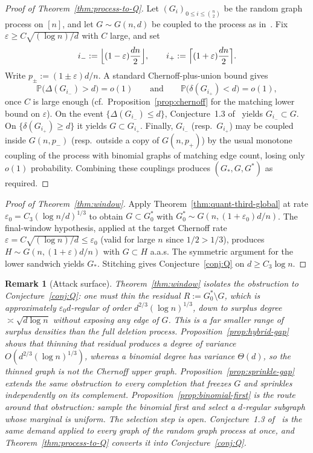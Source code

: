 \documentclass[11pt]{article}
\newtheorem{remark}[theorem]{Remark}
\newcommand{\Gnd}{G(n,d)}
\newcommand{\PP}{\mathbb{P}}
\begin{document}
\begin{proof}[Proof of Theorem~\ref{thm:process-to-Q}]
Let \((G_i)_{0\le i\le\binom{n}{2}}\) be the random graph process on \([n]\), and let
\(G\sim\Gnd\) be coupled to the process as in~\cite[Conjecture~1.3]{BIM25}.
Fix \(\varepsilon\ge C\sqrt{(\log n)/d}\) with \(C\) large, and set
\[
i_-:=\Bigl\lfloor(1-\varepsilon)\frac{dn}{2}\Bigr\rfloor,\qquad
i_+:=\Bigl\lceil(1+\varepsilon)\frac{dn}{2}\Bigr\rceil.
\]
Write \(p_\pm:=(1\pm\varepsilon)d/n\). A standard Chernoff-plus-union bound gives
\[
\PP\bigl(\Delta(G_{i_-})>d\bigr)=o(1)
\qquad\text{and}\qquad
\PP\bigl(\delta(G_{i_+})<d\bigr)=o(1),
\]
once \(C\) is large enough (cf.\ Proposition~\ref{prop:chernoff} for the matching
lower bound on \(\varepsilon\)).
On the event \(\{\Delta(G_{i_-})\le d\}\), Conjecture~1.3 of~\cite{BIM25} yields
\(G_{i_-}\subset G\).
On \(\{\delta(G_{i_+})\ge d\}\) it yields \(G\subset G_{i_+}\).
Finally, \(G_{i_-}\) (resp.\ \(G_{i_+}\)) may be coupled inside
\(G(n,p_-)\) (resp.\ outside a copy of \(G(n,p_+)\)) by the usual monotone coupling
of the process with binomial graphs of matching edge count, losing only \(o(1)\)
probability.
Combining these couplings produces \((G_*,G,G^*)\) as required.
\end{proof}

\begin{proof}[Proof of Theorem~\ref{thm:window}]
Apply Theorem~\ref{thm:quant-third-global} at rate \(\varepsilon_0=C_3(\log n/d)^{1/3}\) to
obtain \(G\subset G^*_0\) with \(G^*_0\sim G(n,(1+\varepsilon_0)d/n)\).
The final-window hypothesis, applied at the target Chernoff rate
\(\varepsilon=C\sqrt{(\log n)/d}\le\varepsilon_0\) (valid for large \(n\) since
\(1/2>1/3\)), produces \(H\sim G(n,(1+\varepsilon)d/n)\) with \(G\subset H\) a.a.s.
The symmetric argument for the lower sandwich yields \(G_*\).
Stitching gives Conjecture~\ref{conj:Q} on \(d\ge C_3\log n\).
\end{proof}

\begin{remark}[Attack surface]
\label{rem:window}
Theorem~\ref{thm:window} isolates the obstruction to Conjecture~\ref{conj:Q}:
one must thin the residual \(R:=G^*_0\setminus G\), which is approximately
\(\varepsilon_0 d\)-regular of order \(d^{2/3}(\log n)^{1/3}\), down to surplus
degree \(\asymp\sqrt{d\log n}\) without exposing any edge of \(G\).
This is a far smaller range of surplus densities than the full deletion process.
Proposition~\ref{prop:hybrid-gap} shows that thinning that residual produces a degree of variance \(O(d^{2/3}(\log n)^{1/3})\), whereas a binomial degree has variance \(\Theta(d)\), so the thinned graph is not the Chernoff upper graph.
Proposition~\ref{prop:sprinkle-gap} extends the same obstruction to every completion that freezes \(G\) and sprinkles independently on its complement.
Proposition~\ref{prop:binomial-first} is the route around that obstruction: sample the binomial first and select a \(d\)-regular subgraph whose marginal is uniform.
The selection step is open.
Conjecture~1.3 of~\cite{BIM25} is the same demand applied to every graph of the random graph process at once, and Theorem~\ref{thm:process-to-Q} converts it into Conjecture~\ref{conj:Q}.
\end{remark}
\end{document}
